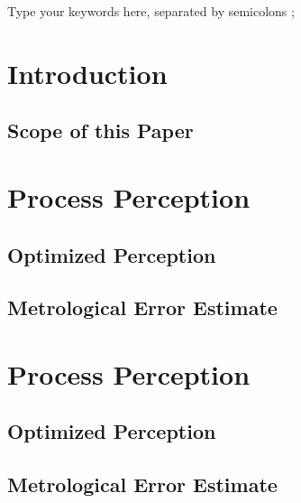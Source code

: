 \documentclass[5p,times,procedia]{elsarticle}
\begin{document}
\begin{frontmatter}
\begin{keyword}
Type your keywords here, separated by semicolons ;




\end{keyword}

\end{frontmatter}



\section{Introduction}
\subsection{Scope of this Paper}

\section{Process Perception}
\subsection{Optimized Perception}
\subsection{Metrological Error Estimate}
\label{error_estimate}


\section{Process Perception}
\subsection{Optimized Perception}
\subsection{Metrological Error Estimate}
\end{document}

